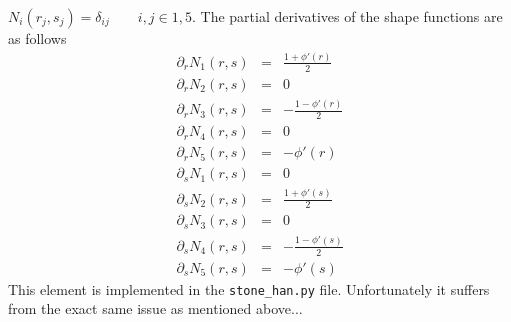 $N_i(r_j,s_j) = \delta_{ij}  \qquad i,j \in 1,5$. The partial derivatives of the shape functions are as follows
\begin{eqnarray}
\partial_r N_1(r,s) &=& \frac{1 + \phi'(r)}{2} \\
\partial_r N_2(r,s) &=& 0 \\
\partial_r N_3(r,s) &=& -\frac{1-\phi'(r)}{2} \\
\partial_r N_4(r,s) &=& 0 \\
\partial_r N_5(r,s) &=& -\phi'(r) \\
\partial_s N_1(r,s) &=& 0 \\
\partial_s N_2(r,s) &=& \frac{1 + \phi'(s)}{2} \\
\partial_s N_3(r,s) &=&  0 \\
\partial_s N_4(r,s) &=& -\frac{1-\phi'(s)}{2} \\
\partial_s N_5(r,s) &=& -\phi'(s)
\end{eqnarray}
This element is implemented in the {\tt stone\_han.py} file. 
Unfortunately it suffers from the exact same issue as mentioned above...






